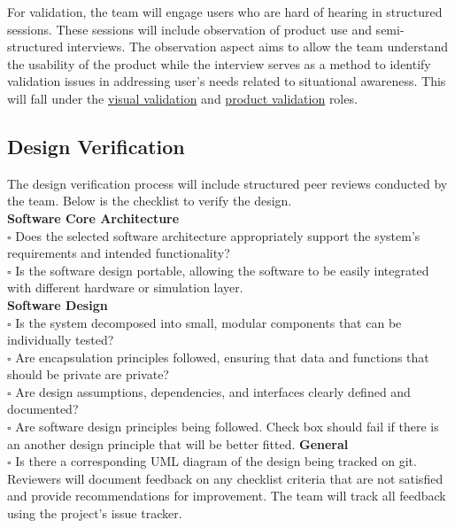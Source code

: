 \documentclass[12pt, titlepage]{article}
\begin{document}
For validation, the team will engage users who are hard of hearing in structured
sessions. These sessions will include observation of product use and
semi-structured interviews. The observation aspect aims to allow the team
understand the usability of the product while the interview serves as a method 
to identify validation issues in addressing user's needs related to situational
awareness. This will fall under the 
\hyperref[role:visual_vnv]{visual validation} and
\hyperref[role:product_validation]{product validation} roles.

\subsection{Design Verification}\label{sec:design_verification}

The design verification process will include structured peer reviews conducted
by the team. Below is the checklist to verify the design.\\
\newline
\textbf{Software Core Architecture} \\
$\square$ Does the selected software architecture appropriately support the
system's requirements and intended functionality? \\
$\square$ Is the software design portable, allowing the software to be easily
integrated with different hardware or simulation layer. \\
\newline
\newline
\textbf{Software Design} \\
$\square$ Is the system decomposed into small, modular components that can be
individually tested? \\
$\square$ Are encapsulation principles followed, ensuring that data and
functions that should be private are private? \\
$\square$ Are design assumptions, dependencies, and interfaces clearly defined
and documented? \\
$\square$ Are software design principles being followed. Check box should fail
if there is an another design principle that will be better fitted.
\newline
\newline
\textbf{General} \\
$\square$ Is there a corresponding UML diagram of the design being tracked on
git. \\

Reviewers will document feedback on any checklist criteria that are not
satisfied and provide recommendations for improvement. The team will track all 
feedback using the project's issue tracker.
\end{document}
